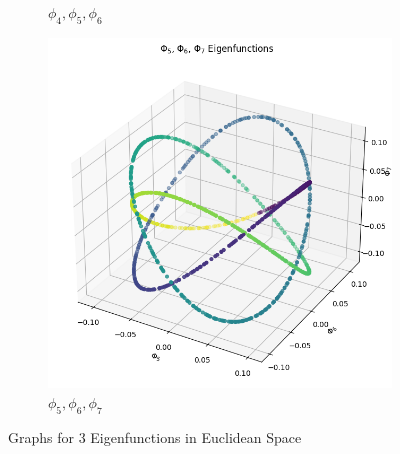 \begin{figure}[H]
\begin{subfigure}{.28\textwidth}
        \caption{$\phi_4, \phi_5, \phi_6$}
    \end{subfigure}%
    \begin{subfigure}{.28\textwidth}
        \includegraphics[width=\linewidth]{images/ex3_task2_part3_3D_6.png}
        \caption{$\phi_5, \phi_6, \phi_7$}
    \end{subfigure}
    
    \caption{Graphs for 3 Eigenfunctions in Euclidean Space}
    \label{fig:task2_3_1}
\end{figure}



